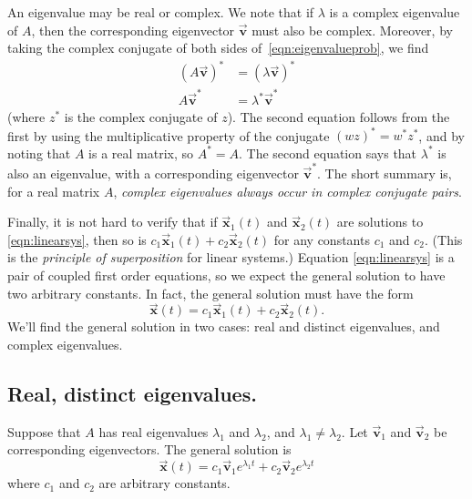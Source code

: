 \documentclass[reqno]{immbook}
\newcommand{\BV}{\vec{\textbf{v}}}
\newcommand{\BX}{\vec{\textbf{x}}}
\numberwithin{equation}{chapter}
\numberwithin{question}{section}
\numberwithin{theorem}{chapter}
\numberwithin{figure}{chapter}
\theoremstyle{definition}
\begin{document}
An eigenvalue may be real or complex. We note that
if $\lambda$ is a complex eigenvalue of $A$, then
the corresponding eigenvector $\BV$ must also be
complex. Moreover, by taking the complex conjugate
of both sides of~\eqref{eqn:eigenvalueprob},
we find
\begin{equation}
\begin{split}
   (A\BV)^* & = (\lambda \BV)^* \\
   A\BV^* & = \lambda^* \BV^*
\end{split}
\end{equation}
(where $z^*$ is the complex conjugate of $z$).
The second equation follows from the first
by using the multiplicative property of the conjugate
$(wz)^* = w^* z^*$, and
by noting that
$A$ is a real matrix, so $A^*=A$.
The second equation says that $\lambda^*$ is also an eigenvalue,
with a corresponding eigenvector $\BV^*$.
The short summary is, for a real matrix $A$,
\emph{complex eigenvalues always occur in complex conjugate
pairs}.

Finally, it is not hard to verify that if $\BX_1(t)$ and
$\BX_2(t)$ are solutions to \eqref{eqn:linearsys}, then
so is $c_1 \BX_1(t) + c_2\BX_2(t)$ for any constants
$c_1$ and $c_2$.
(This is the \emph{principle of superposition} for linear
systems.)
  Equation \eqref{eqn:linearsys} is
a pair of coupled first order equations, so we expect the
general solution to have two arbitrary constants.
In fact, the general solution must have the form
\begin{equation}
  \BX(t) = c_1 \BX_1(t) + c_2 \BX_2(t).
\end{equation}
We'll find the general solution in two cases: real and distinct eigenvalues,
and complex eigenvalues.

\subsection*{Real, distinct eigenvalues.}
Suppose that $A$ has real eigenvalues $\lambda_1$
and $\lambda_2$, and $\lambda_1 \ne \lambda_2$.
Let $\BV_1$ and $\BV_2$ be corresponding eigenvectors.
The general solution is
\begin{equation}
  \BX(t) = c_1 \BV_1 e^{\lambda_1 t} + c_2 \BV_2 e^{\lambda_2 t}
\label{eqn:gensolreal}
\end{equation}
where $c_1$ and $c_2$ are arbitrary constants.
\end{document}
